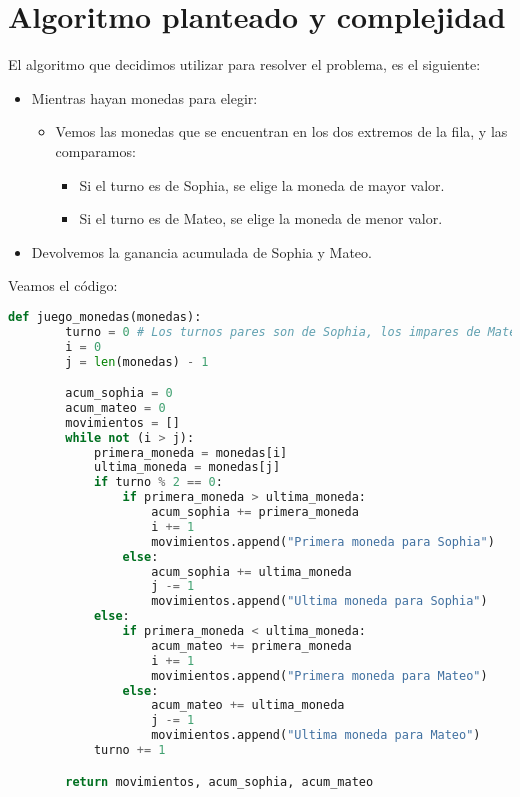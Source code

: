 \section{Algoritmo planteado y complejidad}

El algoritmo que decidimos utilizar para resolver el problema, es el siguiente:

\begin {itemize}
\item Mientras hayan monedas para elegir:
    \begin {itemize}
    \item Vemos las monedas que se encuentran en los dos extremos de la fila, y las comparamos:
        \begin {itemize}
        \item Si el turno es de Sophia, se elige la moneda de mayor valor.
        \item Si el turno es de Mateo, se elige la moneda de menor valor.
        \end {itemize}
    \end {itemize}
\item Devolvemos la ganancia acumulada de Sophia y Mateo.
\end {itemize}

Veamos el código:

\begin{lstlisting}[language=Python]
    def juego_monedas(monedas):
        turno = 0 # Los turnos pares son de Sophia, los impares de Mateo
        i = 0
        j = len(monedas) - 1

        acum_sophia = 0
        acum_mateo = 0
        movimientos = []
        while not (i > j):
            primera_moneda = monedas[i]
            ultima_moneda = monedas[j]
            if turno % 2 == 0:
                if primera_moneda > ultima_moneda:
                    acum_sophia += primera_moneda
                    i += 1
                    movimientos.append("Primera moneda para Sophia")
                else:
                    acum_sophia += ultima_moneda
                    j -= 1
                    movimientos.append("Ultima moneda para Sophia")
            else:
                if primera_moneda < ultima_moneda:
                    acum_mateo += primera_moneda
                    i += 1
                    movimientos.append("Primera moneda para Mateo")
                else:
                    acum_mateo += ultima_moneda
                    j -= 1
                    movimientos.append("Ultima moneda para Mateo")
            turno += 1

        return movimientos, acum_sophia, acum_mateo
\end{lstlisting}

